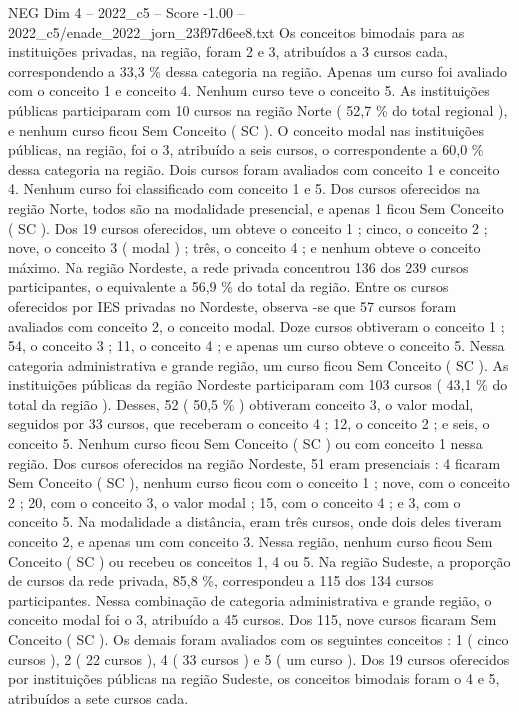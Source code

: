 \begin{textsample}{NEG Dim 4 – 2022\_c5 – Score -1.00 – 2022\_c5/enade\_2022\_jorn\_23f97d6ee8.txt}
Os conceitos bimodais para as instituições privadas, na região, foram 2 e 3, atribuídos a 3 cursos cada, correspondendo a 33,3 \% dessa categoria na região.
Apenas um curso foi avaliado com o conceito 1 e conceito 4.
Nenhum curso teve o conceito 5.
As instituições públicas participaram com 10 cursos na região Norte ( 52,7 \% do total regional ), e nenhum curso ficou Sem Conceito ( SC ).
O conceito modal nas instituições públicas, na região, foi o 3, atribuído a seis cursos, o correspondente a 60,0 \% dessa categoria na região.
Dois cursos foram avaliados com conceito 1 e conceito 4.
Nenhum curso foi classificado com conceito 1 e 5.
Dos cursos oferecidos na região Norte, todos são na modalidade presencial, e apenas 1 ficou Sem Conceito ( SC ).
Dos 19 cursos oferecidos, um obteve o conceito 1 ; cinco, o conceito 2 ; nove, o conceito 3 ( modal ) ; três, o conceito 4 ; e nenhum obteve o conceito máximo.
Na região Nordeste, a rede privada concentrou 136 dos 239 cursos participantes, o equivalente a 56,9 \% do total da região.
Entre os cursos oferecidos por IES privadas no Nordeste, observa -se que 57 cursos foram avaliados com conceito 2, o conceito modal.
Doze cursos obtiveram o conceito 1 ; 54, o conceito 3 ; 11, o conceito 4 ; e apenas um curso obteve o conceito 5.
Nessa categoria administrativa e grande região, um curso ficou Sem Conceito ( SC ).
As instituições públicas da região Nordeste participaram com 103 cursos ( 43,1 \% do total da região ).
Desses, 52 ( 50,5 \% ) obtiveram conceito 3, o valor modal, seguidos por 33 cursos, que receberam o conceito 4 ; 12, o conceito 2 ; e seis, o conceito 5.
Nenhum curso ficou Sem Conceito ( SC ) ou com conceito 1 nessa região.
Dos cursos oferecidos na região Nordeste, 51 eram presenciais : 4 ficaram Sem Conceito ( SC ), nenhum curso ficou com o conceito 1 ; nove, com o conceito 2 ; 20, com o conceito 3, o valor modal ; 15, com o conceito 4 ; e 3, com o conceito 5.
Na modalidade a distância, eram três cursos, onde dois deles tiveram conceito 2, e apenas um com conceito 3.
Nessa região, nenhum curso ficou Sem Conceito ( SC ) ou recebeu os conceitos 1, 4 ou 5.
Na região Sudeste, a proporção de cursos da rede privada, 85,8 \%, correspondeu a 115 dos 134 cursos participantes.
Nessa combinação de categoria administrativa e grande região, o conceito modal foi o 3, atribuído a 45 cursos.
Dos 115, nove cursos ficaram Sem Conceito ( SC ).
Os demais foram avaliados com os seguintes conceitos : 1 ( cinco cursos ), 2 ( 22 cursos ), 4 ( 33 cursos ) e 5 ( um curso ).
Dos 19 cursos oferecidos por instituições públicas na região Sudeste, os conceitos bimodais foram o 4 e 5, atribuídos a sete cursos cada.

\end{textsample}
